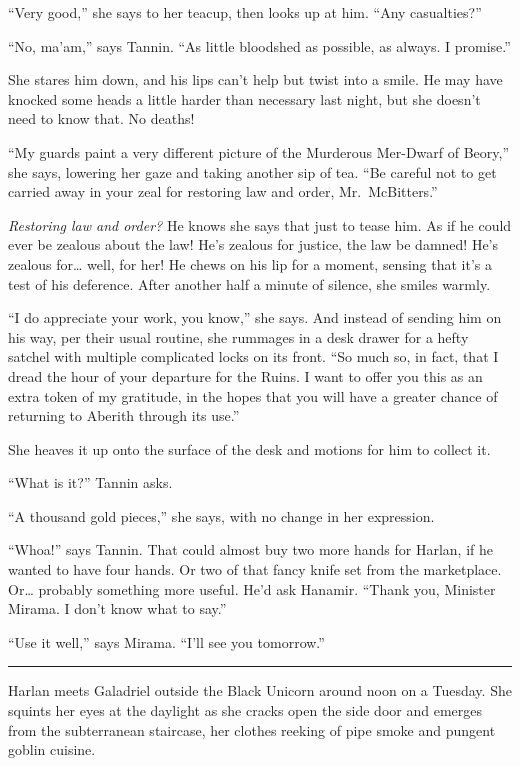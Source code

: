 \documentclass[smalldemyvopaper,11pt,twoside,onecolumn,openright,extrafontsizes]{memoir}
\begin{document}
``Very good,'' she says to her teacup, then looks up at him. ``Any
casualties?''

``No, ma'am,'' says Tannin. ``As little bloodshed as possible, as
always. I promise.''

She stares him down, and his lips can't help but twist into a smile. He
may have knocked some heads a little harder than necessary last night,
but she doesn't need to know that. No deaths!

``My guards paint a very different picture of the Murderous Mer-Dwarf of
Beory,'' she says, lowering her gaze and taking another sip of tea. ``Be
careful not to get carried away in your zeal for restoring law and
order, Mr.~McBitters.''

\emph{Restoring law and order?} He knows she says that just to tease
him. As if he could ever be zealous about the law! He's zealous for
justice, the law be damned! He's zealous for\ldots{} well, for her! He
chews on his lip for a moment, sensing that it's a test of his
deference. After another half a minute of silence, she smiles warmly.

``I do appreciate your work, you know,'' she says. And instead of
sending him on his way, per their usual routine, she rummages in a desk
drawer for a hefty satchel with multiple complicated locks on its front.
``So much so, in fact, that I dread the hour of your departure for the
Ruins. I want to offer you this as an extra token of my gratitude, in
the hopes that you will have a greater chance of returning to Aberith
through its use.''

She heaves it up onto the surface of the desk and motions for him to
collect it.

``What is it?'' Tannin asks.

``A thousand gold pieces,'' she says, with no change in her expression.

``Whoa!'' says Tannin. That could almost buy two more hands for Harlan,
if he wanted to have four hands. Or two of that fancy knife set from the
marketplace. Or\ldots{} probably something more useful. He'd ask
Hanamir. ``Thank you, Minister Mirama. I don't know what to say.''

``Use it well,'' says Mirama. ``I'll see you tomorrow.''

\begin{center}\rule{0.5\linewidth}{\linethickness}\end{center}

Harlan meets Galadriel outside the Black Unicorn around noon on a
Tuesday. She squints her eyes at the daylight as she cracks open the
side door and emerges from the subterranean staircase, her clothes
reeking of pipe smoke and pungent goblin cuisine.
\end{document}

